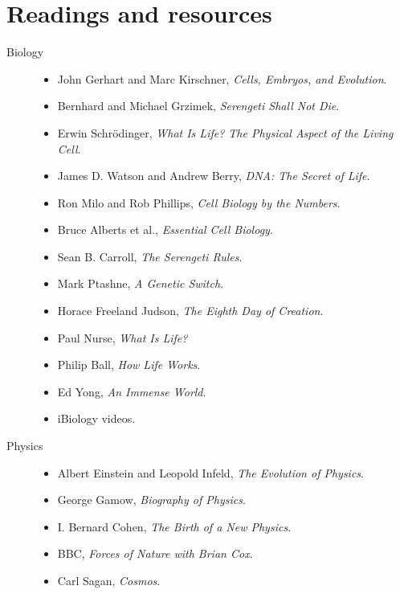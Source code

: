 \clearpage
\section{Readings and resources}
\label{app:readings}

\begin{description}

    \item[Biology]
    \begin{itemize}
        \item John Gerhart and Marc Kirschner, \textit{Cells, Embryos, and Evolution}.
        \item Bernhard and Michael Grzimek, \textit{Serengeti Shall Not Die}.
        \item Erwin Schrödinger, \textit{What Is Life? The Physical Aspect of the Living Cell}.
        \item James D. Watson and Andrew Berry, \textit{DNA: The Secret of Life}.
        \item Ron Milo and Rob Phillips, \textit{Cell Biology by the Numbers}.
        \item Bruce Alberts et al., \textit{Essential Cell Biology}.
        \item Sean B. Carroll, \textit{The Serengeti Rules}.
        \item Mark Ptashne, \textit{A Genetic Switch}.
        \item Horace Freeland Judson, \textit{The Eighth Day of Creation}.
        \item Paul Nurse, \textit{What Is Life?}
        \item Philip Ball, \textit{How Life Works}.
        \item Ed Yong, \textit{An Immense World}.
        \item iBiology videos.
    \end{itemize}

    \item[Physics]
    \begin{itemize}
        \item Albert Einstein and Leopold Infeld, \textit{The Evolution of Physics}.
        \item George Gamow, \textit{Biography of Physics}.
        \item I. Bernard Cohen, \textit{The Birth of a New Physics}.
        \item BBC, \textit{Forces of Nature with Brian Cox}.
        \item Carl Sagan, \textit{Cosmos}.
    \end{itemize}


\end{description}
